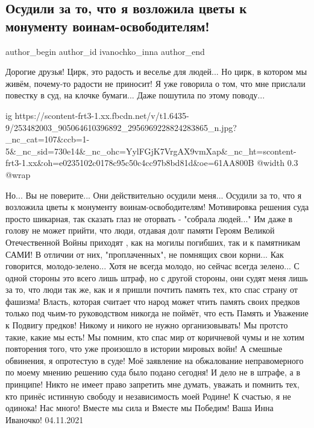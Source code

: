  
 
 
 
 
 
\subsection{Осудили за то, что я возложила цветы к монументу воинам-освободителям!}
\label{sec:05_11_2021.fb.ivanochko_inna.1.sud_cvety_voiny_osvoboditeli}
 
\ifcmt
 author_begin
   author_id ivanochko_inna
 author_end
\fi

\obeycr
Дорогие друзья! 
Цирк, это радость и веселье для людей...
Но цирк, в котором мы живём, почему-то радости не приносит! 
Я уже говорила о том, что мне прислали повестку в суд, на клочке бумаги... 
Даже пошутила по этому поводу... 
\restorecr

\ifcmt
  ig https://scontent-frt3-1.xx.fbcdn.net/v/t1.6435-9/253482003_905064610396892_2956969228824283865_n.jpg?_nc_cat=107&ccb=1-5&_nc_sid=730e14&_nc_ohc=YylFGjK7VrgAX9vmXap&_nc_ht=scontent-frt3-1.xx&oh=e0235102c0178c95c50c4cc97b8bd81d&oe=61AA800B
  @width 0.3
  @wrap 
\fi

\obeycr
Но... 
Вы не поверите... 
Они действительно осудили меня... 
Осудили за то, что я  возложила цветы к монументу воинам-освободителям! 
Мотивировка решения суда  просто шикарная, так сказать  глаз не оторвать - "собрала людей..." 
Им даже в голову не может прийти, что люди, отдавая долг памяти Героям Великой Отечественной Войны приходят , как на могилы погибших, так и к памятникам САМИ! 
В отличии от них, "проплаченных", не помнящих свои корни... 
Как говорится, молодо-зелено... 
Хотя не всегда молодо, но сейчас всегда зелено... 
С одной стороны  это всего лишь штраф, но с другой стороны, они судят меня лишь за то, что люди  так же, как и я пришли почтить память тех, кто спас страну от фашизма! 
Власть, которая считает что народ может чтить память своих предков только под чьим-то руководством  никогда не поймёт, что есть Память и Уважение к Подвигу предков! 
Никому и никого не нужно организовывать! 
Мы протсто такие, какие мы есть! 
Мы помним, кто спас мир от коричневой чумы и не хотим повторения того, что уже произошло в истории мировых войн! 
А смешные обвинения, я опротестую в суде! 
Моё заявление на обжалование неправомерного по моему мнению  решению суда было подано сегодня! 
И дело не в штрафе, а в принципе! 
Никто не имеет право запретить мне думать, уважать и помнить тех, кто принёс истинную свободу и независимость моей Родине! 
К счастью, я не одинока! 
Нас много! 
Вместе мы сила и Вместе мы Победим! 
Ваша Инна Иваночко!
04.11.2021
\restorecr
